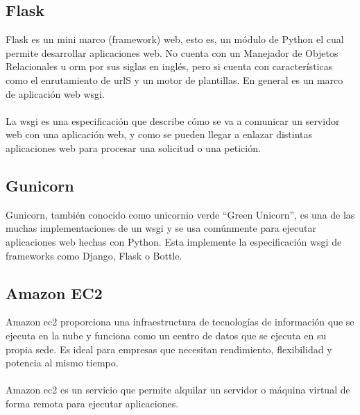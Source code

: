 \documentclass[12pt, a4paper, titlepage]{article}
\begin{document}
	\subsection{Flask}
	Flask es un mini marco (framework) web, esto es, un módulo de Python el cual permite desarrollar aplicaciones web. No cuenta con un Manejador de Objetos Relacionales u \acrshort{orm} por sus siglas en inglés, pero si cuenta con características como el enrutamiento de \acrshort{url}S y un motor de plantillas. En general es un marco de aplicación web \acrshort{wsgi}.\\\\
	La \acrfull{wsgi} es una especificación que describe cómo se va a comunicar un servidor web con una aplicación web, y como se pueden llegar a enlazar distintas aplicaciones web para procesar una solicitud o una petición.
	\subsection{Gunicorn}
	Gunicorn, también conocido como unicornio verde “Green Unicorn”, es una de las muchas implementaciones de un \acrfull{wsgi} y se usa comúnmente para ejecutar aplicaciones web hechas con Python. Esta implemente la especificación \acrshort{wsgi} de frameworks como Django, Flask o Bottle.
	\subsection{Amazon EC2}	
	Amazon \acrfull{ec2} \cite{amazon_ec2} proporciona una infraestructura de tecnologías de información que se ejecuta en la nube y funciona como un centro de datos que se ejecuta en su propia sede. Es ideal para empresas que necesitan rendimiento, flexibilidad y potencia al mismo tiempo.\\\\
	Amazon \acrshort{ec2} es un servicio que permite alquilar un servidor o máquina virtual de forma remota para ejecutar aplicaciones.
\end{document}
